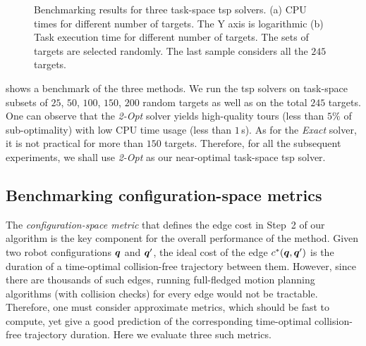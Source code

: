 \begin{figure}[t]
  \centering
  \vspace*{2mm}
  \;
  \caption{Benchmarking results for three task-space \ac{tsp} solvers. (a) CPU
  times for different number of targets. The Y axis is logarithmic (b) Task
  execution time for different number of targets. The sets of targets are
  selected randomly. The last sample considers all the $245$ targets.}
  \label{fig:tsp_solvers}
\end{figure}

 shows a benchmark of the three methods. We run the
\ac{tsp} solvers on task-space subsets of $25$, $50$, $100$, $150$, $200$ random
targets as well as on the total $245$ targets.  One can observe that the
\textit{2-Opt} solver yields high-quality tours (less than $5\%$ of
sub-optimality) with low CPU time usage (less than $1$\,s). As for the
\textit{Exact} solver, it is not practical for more than $150$ targets.
Therefore, for all the subsequent experiments, we shall use \textit{2-Opt} as
our near-optimal task-space \ac{tsp} solver.

\subsection{Benchmarking configuration-space metrics}
\label{sub:metrics_benchmark}

The \textit{configuration-space metric} that defines the edge cost in Step~2 of
our algorithm is the key component for the overall performance of the method.
Given two robot configurations $\vb*{q}$ and $\vb*{q}'$, the ideal cost of the
edge $c^{*}\qty(\vb*{q}, \vb*{q}')$ is the duration of a time-optimal
collision-free trajectory between them. However, since there are thousands of
such edges, running full-fledged motion planning algorithms (with collision
checks) for every edge would not be tractable. Therefore, one must consider
approximate metrics, which should be fast to compute, yet give a good prediction
of the corresponding time-optimal collision-free trajectory duration. Here we
evaluate three such metrics.

